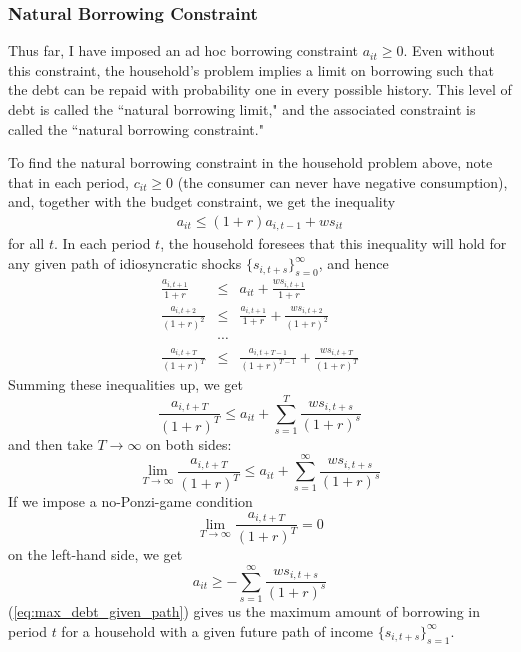 \documentclass[12pt]{article}
\begin{document}
\subsubsection{Natural Borrowing Constraint}
Thus far, I have imposed an ad hoc borrowing constraint $a_{it} \geq 0$. Even without this constraint, the household's problem implies a limit on borrowing such that the debt can be repaid with probability one in every possible history. This level of debt is called the ``natural borrowing limit," and the associated constraint is called the ``natural borrowing constraint."

To find the natural borrowing constraint in the household problem above, note that in each period, $c_{it} \geq 0$ (the consumer can never have negative consumption), and, together with the budget constraint, we get the inequality 
\begin{eqnarray*}
	a_{it} \leq (1+r) a_{i,t-1} + w s_{it}
\end{eqnarray*}
for all $t$. In each period $t$, the household foresees that this inequality will hold for any given path of idiosyncratic shocks $\{s_{i,t+s}\}_{s=0}^\infty$, and hence
\begin{eqnarray*}
	\frac{a_{i,t+1}}{1+r} &\leq& a_{it} + \frac{ws_{i,t+1}}{1+r} \\
	\frac{a_{i,t+2}}{(1+r)^2} &\leq& \frac{a_{i,t+1}}{1+r} + \frac{ws_{i,t+2}}{(1+r)^2} \\
	& \cdots & \\
	\frac{a_{i,t+T}}{(1+r)^T} &\leq& \frac{a_{i,t+T-1}}{(1+r)^{T-1}} + \frac{ws_{i,t+T}}{(1+r)^T}
\end{eqnarray*}
Summing these inequalities up, we get
\begin{equation*}
	\frac{a_{i,t+T}}{(1+r)^T} \leq a_{it} + \sum_{s=1}^T \frac{ws_{i,t+s}}{(1+r)^{s}}
\end{equation*}
and then take $T \to \infty$ on both sides:
\begin{equation*}
	\lim_{T \to \infty} \frac{a_{i,t+T}}{(1+r)^T} \leq a_{it} + \sum_{s=1}^\infty \frac{ws_{i,t+s}}{(1+r)^{s}}
\end{equation*}
If we impose a no-Ponzi-game condition
\[\lim_{T \to \infty} \frac{a_{i,t+T}}{(1+r)^T} = 0\]
 on the left-hand side, we get
 \begin{equation} \label{eq:max_debt_given_path}
 	a_{it} \geq - \sum_{s=1}^\infty \frac{ws_{i,t+s}}{(1+r)^{s}}
 \end{equation}
(\ref{eq:max_debt_given_path}) gives us the maximum amount of borrowing in period $t$ for a household with a given future path of income $\{s_{i,t+s}\}_{s=1}^\infty$. 
\end{document}
